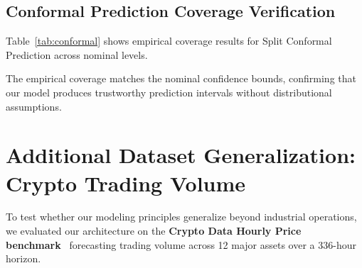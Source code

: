 \documentclass[11pt,a4paper]{article}
\begin{document}
\subsection{Conformal Prediction Coverage Verification}
Table~\ref{tab:conformal} shows empirical coverage results for Split Conformal Prediction across nominal levels.

\begin{table}[htbp]
\centering
\caption{Split conformal prediction empirical coverage on held-out test data.}
\label{tab:conformal}
\vspace{2mm}
\end{table}

The empirical coverage matches the nominal confidence bounds, confirming that our model produces trustworthy prediction intervals without distributional assumptions.

\section{Additional Dataset Generalization: Crypto Trading Volume}
To test whether our modeling principles generalize beyond industrial operations, we evaluated our architecture on the \textbf{Crypto Data Hourly Price benchmark}~\cite{julien2023crypto} forecasting trading volume across 12 major assets over a 336-hour horizon.

\begin{table}[htbp]
\centering
\caption{Generalization benchmark on real Binance Crypto Hourly Trading Volume (Julien, 2023).}
\label{tab:crypto}
\vspace{2mm}
\end{table}
\end{document}
